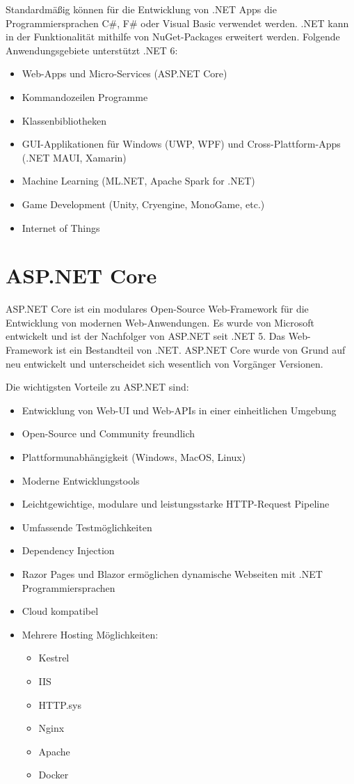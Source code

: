 Standardmäßig können für die Entwicklung von .NET Apps die Programmiersprachen C\#, F\# oder Visual Basic verwendet werden. 
.NET kann in der Funktionalität mithilfe von NuGet-Packages erweitert werden. Folgende Anwendungsgebiete unterstützt .NET 6:
\begin{itemize}
    \item Web-Apps und Micro-Services (ASP.NET Core)
    \item Kommandozeilen Programme
    \item Klassenbibliotheken
    \item GUI-Applikationen für Windows (UWP, WPF) und Cross-Plattform-Apps (.NET MAUI, Xamarin)
    \item Machine Learning (ML.NET, Apache Spark for .NET)
    \item Game Development (Unity, Cryengine, MonoGame, etc.)
    \item Internet of Things
\end{itemize}

\newpage
\section{ASP.NET Core}
\cite{ASPNETCoreDocumentation}
\cite{RazorPagesITVision}
\cite{ASPNETCoreWikipedia}

ASP.NET Core ist ein modulares Open-Source Web-Framework für die Entwicklung von modernen Web-Anwendungen.
Es wurde von Microsoft entwickelt und ist der Nachfolger von ASP.NET seit .NET 5. Das Web-Framework ist ein Bestandteil von 
.NET. ASP.NET Core wurde von Grund auf neu entwickelt und unterscheidet sich wesentlich von Vorgänger Versionen. 

Die wichtigsten Vorteile zu ASP.NET sind:
\begin{itemize}
    \item Entwicklung von Web-UI und Web-APIs in einer einheitlichen Umgebung
    \item Open-Source und Community freundlich
    \item Plattformunabhängigkeit (Windows, MacOS, Linux)
    \item Moderne Entwicklungstools
    \item Leichtgewichtige, modulare und leistungsstarke HTTP-Request Pipeline
    \item Umfassende Testmöglichkeiten
    \item Dependency Injection
    \item Razor Pages und Blazor ermöglichen dynamische Webseiten mit .NET Programmiersprachen
    \item Cloud kompatibel
    \item Mehrere Hosting Möglichkeiten:
    \begin{itemize}
        \item Kestrel
        \item IIS
        \item HTTP.sys
        \item Nginx
        \item Apache
        \item Docker
    \end{itemize}
\end{itemize}

